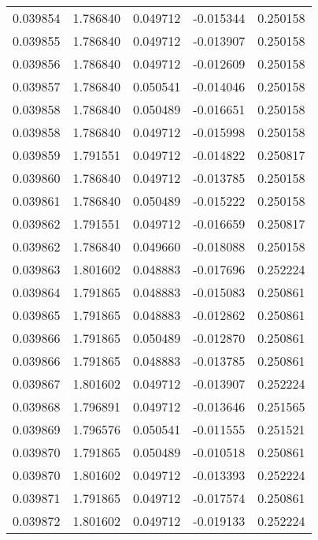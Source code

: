 \begin{tabular}{lrrrr}
0.039854    &  1.786840 &  0.049712 & -0.015344 &             0.250158 \\
0.039855    &  1.786840 &  0.049712 & -0.013907 &             0.250158 \\
0.039856    &  1.786840 &  0.049712 & -0.012609 &             0.250158 \\
0.039857    &  1.786840 &  0.050541 & -0.014046 &             0.250158 \\
0.039858    &  1.786840 &  0.050489 & -0.016651 &             0.250158 \\
0.039858    &  1.786840 &  0.049712 & -0.015998 &             0.250158 \\
0.039859    &  1.791551 &  0.049712 & -0.014822 &             0.250817 \\
0.039860    &  1.786840 &  0.049712 & -0.013785 &             0.250158 \\
0.039861    &  1.786840 &  0.050489 & -0.015222 &             0.250158 \\
0.039862    &  1.791551 &  0.049712 & -0.016659 &             0.250817 \\
0.039862    &  1.786840 &  0.049660 & -0.018088 &             0.250158 \\
0.039863    &  1.801602 &  0.048883 & -0.017696 &             0.252224 \\
0.039864    &  1.791865 &  0.048883 & -0.015083 &             0.250861 \\
0.039865    &  1.791865 &  0.048883 & -0.012862 &             0.250861 \\
0.039866    &  1.791865 &  0.050489 & -0.012870 &             0.250861 \\
0.039866    &  1.791865 &  0.048883 & -0.013785 &             0.250861 \\
0.039867    &  1.801602 &  0.049712 & -0.013907 &             0.252224 \\
0.039868    &  1.796891 &  0.049712 & -0.013646 &             0.251565 \\
0.039869    &  1.796576 &  0.050541 & -0.011555 &             0.251521 \\
0.039870    &  1.791865 &  0.050489 & -0.010518 &             0.250861 \\
0.039870    &  1.801602 &  0.049712 & -0.013393 &             0.252224 \\
0.039871    &  1.791865 &  0.049712 & -0.017574 &             0.250861 \\
0.039872    &  1.801602 &  0.049712 & -0.019133 &             0.252224 \\

\end{tabular}
